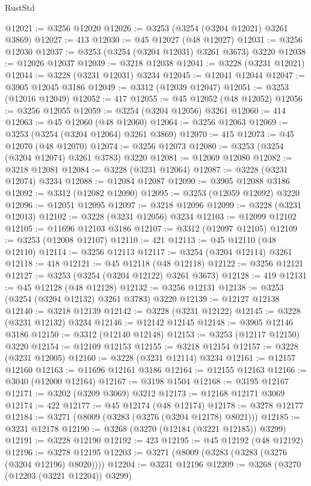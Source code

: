 \begin{lexlean}{RustStd}
\begin{coremodule}
@12021 := @3256 @12020
@12026 := @3253 (@3254 (@3204 @12021) @3261 @3869)
@12027 := 413
@12030 := @45 @12027 (@48 @12027)
@12031 := @3256 @12030
@12037 := @3253 (@3254 (@3204 @12031) @3261 @3673) @3220
@12038 := @12026 @12037
@12039 := @3218 @12038
@12041 := @3228 (@3231 @12021)
@12044 := @3228 (@3231 @12031) @3234
@12045 := @12041 @12044
@12047 := @3905 @12045 @3186
@12049 := @3312 (@12039 @12047)
@12051 := @3253 (@12016 @12049)
@12052 := 417
@12055 := @45 @12052 (@48 @12052)
@12056 := @3256 @12055
@12059 := @3254 (@3204 @12056) @3261
@12060 := 414
@12063 := @45 @12060 (@48 @12060)
@12064 := @3256 @12063
@12069 := @3253 (@3254 (@3204 @12064) @3261 @3869)
@12070 := 415
@12073 := @45 @12070 (@48 @12070)
@12074 := @3256 @12073
@12080 := @3253 (@3254 (@3204 @12074) @3261 @3783) @3220
@12081 := @12069 @12080
@12082 := @3218 @12081
@12084 := @3228 (@3231 @12064)
@12087 := @3228 (@3231 @12074) @3234
@12088 := @12084 @12087
@12090 := @3905 @12088 @3186
@12092 := @3312 (@12082 @12090)
@12095 := @3253 (@12059 @12092) @3220
@12096 := @12051 @12095
@12097 := @3218 @12096
@12099 := @3228 (@3231 @12013)
@12102 := @3228 (@3231 @12056) @3234
@12103 := @12099 @12102
@12105 := @11696 @12103 @3186
@12107 := @3312 (@12097 @12105)
@12109 := @3253 (@12008 @12107)
@12110 := 421
@12113 := @45 @12110 (@48 @12110)
@12114 := @3256 @12113
@12117 := @3254 (@3204 @12114) @3261
@12118 := 418
@12121 := @45 @12118 (@48 @12118)
@12122 := @3256 @12121
@12127 := @3253 (@3254 (@3204 @12122) @3261 @3673)
@12128 := 419
@12131 := @45 @12128 (@48 @12128)
@12132 := @3256 @12131
@12138 := @3253 (@3254 (@3204 @12132) @3261 @3783) @3220
@12139 := @12127 @12138
@12140 := @3218 @12139
@12142 := @3228 (@3231 @12122)
@12145 := @3228 (@3231 @12132) @3234
@12146 := @12142 @12145
@12148 := @3905 @12146 @3186
@12150 := @3312 (@12140 @12148)
@12153 := @3253 (@12117 @12150) @3220
@12154 := @12109 @12153
@12155 := @3218 @12154
@12157 := @3228 (@3231 @12005)
@12160 := @3228 (@3231 @12114) @3234
@12161 := @12157 @12160
@12163 := @11696 @12161 @3186
@12164 := @12155 @12163
@12166 := @3040 (@12000 @12164)
@12167 := @3198 @1504
@12168 := @3195 @12167
@12171 := @3202 (@3209 @3069) @3212
@12173 := @12168 @12171 @3069
@12174 := 422
@12177 := @45 @12174 (@48 @12174)
@12178 := @3278 @12177
@12184 := @3271 (@8009 (@3283 (@3276 (@3204 @12178) @8021)))
@12185 := @3231 @12178
@12190 := @3268 (@3270 (@12184 (@3221 @12185)) @3299)
@12191 := @3228 @12190
@12192 := 423
@12195 := @45 @12192 (@48 @12192)
@12196 := @3278 @12195
@12203 := @3271 (@8009 (@3283 (@3283 (@3276 (@3204 @12196) @8020))))
@12204 := @3231 @12196
@12209 := @3268 (@3270 (@12203 (@3221 @12204)) @3299)

\end{coremodule}
\end{lexlean}
